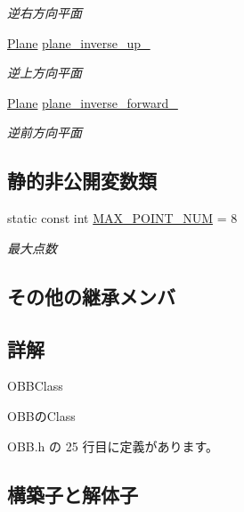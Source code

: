 \begin{DoxyCompactItemize}
\begin{DoxyCompactList}\small\item\em 逆右方向平面 \end{DoxyCompactList}\item 
\mbox{\hyperlink{class_plane}{Plane}} \mbox{\hyperlink{class_o_b_b_a8c2a3115a77a13ab42e802a0aa2b1d46}{plane\+\_\+inverse\+\_\+up\+\_\+}}
\begin{DoxyCompactList}\small\item\em 逆上方向平面 \end{DoxyCompactList}\item 
\mbox{\hyperlink{class_plane}{Plane}} \mbox{\hyperlink{class_o_b_b_a67a81b0cc4d008b029b885364a1beb28}{plane\+\_\+inverse\+\_\+forward\+\_\+}}
\begin{DoxyCompactList}\small\item\em 逆前方向平面 \end{DoxyCompactList}\end{DoxyCompactItemize}
\subsection*{静的非公開変数類}
\begin{DoxyCompactItemize}
\item 
static const int \mbox{\hyperlink{class_o_b_b_a1ca2ca983bccd4a2789519a44b71ceaf}{M\+A\+X\+\_\+\+P\+O\+I\+N\+T\+\_\+\+N\+UM}} = 8
\begin{DoxyCompactList}\small\item\em 最大点数 \end{DoxyCompactList}\end{DoxyCompactItemize}
\subsection*{その他の継承メンバ}


\subsection{詳解}
O\+B\+B\+Class 

O\+B\+Bの\+Class 

 O\+B\+B.\+h の 25 行目に定義があります。



\subsection{構築子と解体子}
\mbox{\label{class_o_b_b_aa95ab77e0c88faf68db43ed7f6b0ea5a}} 

